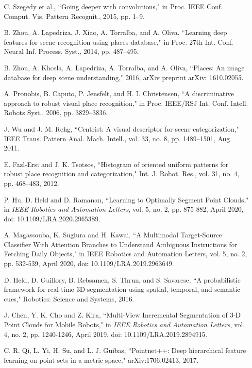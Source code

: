\documentclass[letterpaper,12pt]{article}
\begin{document}
\begin{thebibliography}{99}
\bibitem{} C. Szegedy et al., ``Going deeper with convolutions," in Proc.
IEEE Conf. Comput. Vis. Pattern Recognit., 2015, pp. 1--9.

\bibitem{} B. Zhou, A. Lapedriza, J. Xiao, A. Torralba, and A. Oliva,
``Learning deep features for scene recognition using places database," in
Proc. 27th Int. Conf. Neural Inf. Process. Syst., 2014, pp. 487--495.

\bibitem{} B. Zhou, A. Khosla, A. Lapedriza, A. Torralba, and A. Oliva,
``Places: An image database for deep scene understanding," 2016, arXiv
preprint arXiv: 1610.02055.

\bibitem{}A. Pronobis, B. Caputo, P. Jensfelt, and H. I. Christensen, ``A
discriminative approach to robust visual place recognition," in Proc.
IEEE/RSJ Int. Conf. Intell. Robots Syst., 2006, pp. 3829--3836.

\bibitem{} J. Wu and J. M. Rehg, ``Centrist: A visual descriptor for scene
categorization," IEEE Trans. Pattern Anal. Mach. Intell., vol. 33, no.
8, pp. 1489--1501, Aug. 2011.

\bibitem{} E. Fazl-Ersi and J. K. Tsotsos, ``Histogram of oriented uniform
patterns for robust place recognition and categorization," Int. J.
Robot. Res., vol. 31, no. 4, pp. 468--483, 2012.

\bibitem{} P. Hu, D. Held and D. Ramanan, ``Learning to Optimally Segment
Point Clouds," in \emph{IEEE Robotics and Automation Letters}, vol. 5,
no. 2, pp. 875-882, April 2020, doi: 10.1109/LRA.2020.2965389.

\bibitem{} A. Magassouba, K. Sugiura and H. Kawai, ``A Multimodal
Target-Source Classifier With Attention Branches to Understand Ambiguous
Instructions for Fetching Daily Objects," in IEEE Robotics and
Automation Letters, vol. 5, no. 2, pp. 532-539, April 2020, doi:
10.1109/LRA.2019.2963649.

\bibitem{} D. Held, D. Guillory, B. Rebsamen, S. Thrun, and S. Savarese,
``A probabilistic framework for real-time 3D segmentation using spatial,
temporal, and semantic cues," Robotics: Science and Systems, 2016.

\bibitem{} J. Chen, Y. K. Cho and Z. Kira, ``Multi-View Incremental
Segmentation of 3-D Point Clouds for Mobile Robots," in \emph{IEEE
	Robotics and Automation Letters}, vol. 4, no. 2, pp. 1240-1246, April
2019, doi: 10.1109/LRA.2019.2894915.

\bibitem{} C. R. Qi, L. Yi, H. Su, and L. J. Guibas, ``Pointnet++: Deep
hierarchical feature learning on point sets in a metric space,"
arXiv:1706.02413, 2017.


\end{thebibliography}
\end{document}
